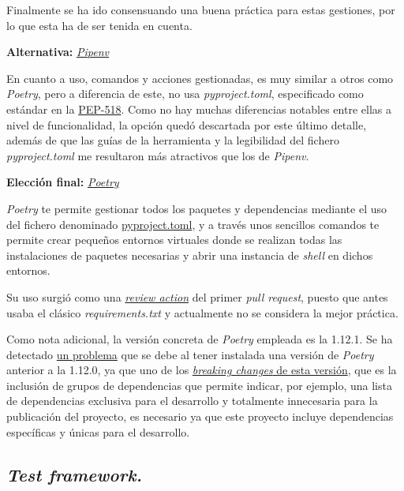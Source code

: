 Finalmente se ha ido consensuando una buena práctica para estas gestiones, por lo que esta ha de ser tenida en cuenta.

\textbf{Alternativa:} \href{https://pipenv-es.readthedocs.io/es/latest/}{\textit{Pipenv}}

En cuanto a uso, comandos y acciones gestionadas, es muy similar a otros como \textit{Poetry}, pero a diferencia de este, no usa \textit{pyproject.toml}, especificado como estándar en la \href{https://peps.python.org/pep-0518/}{PEP-518}. Como no hay muchas diferencias notables entre ellas a nivel de funcionalidad, la opción quedó descartada por este último detalle, además de que las guías de la herramienta y la legibilidad del fichero \textit{pyproject.toml} me resultaron más atractivos que los de \textit{Pipenv}.

\textbf{Elección final:} \href{https://python-poetry.org/}{\textit{Poetry}}

\textit{Poetry} te permite gestionar todos los paquetes y dependencias mediante el uso del fichero denominado \href{https://github.com/Anglepi/My-Many-Reads/blob/main/pyproject.toml}{pyproject.toml}, y a través unos sencillos comandos te permite crear pequeños entornos virtuales donde se realizan todas las instalaciones de paquetes necesarias y abrir una instancia de \textit{shell} en dichos entornos.

Su uso surgió como una \href{https://github.com/Anglepi/My-Many-Reads/pull/39#discussion_r974230463}{\textit{review action}} del primer \textit{pull request}, puesto que antes usaba el clásico \textit{requirements.txt} y actualmente no se considera la mejor práctica.

Como nota adicional, la versión concreta de \textit{Poetry} empleada es la 1.12.1. Se ha detectado \href{https://github.com/Anglepi/My-Many-Reads/issues/125}{un problema} que se debe al tener instalada una versión de \textit{Poetry} anterior a la 1.12.0, ya que uno de los \href{https://python-poetry.org/blog/announcing-poetry-1.2.0/}{\textit{breaking changes} de esta versión}, que es la inclusión de grupos de dependencias que permite indicar, por ejemplo, una lista de dependencias exclusiva para el desarrollo y totalmente innecesaria para la publicación del proyecto, es necesario ya que este proyecto incluye dependencias específicas y únicas para el desarrollo.

\subsection{\textit{Test framework.}}


